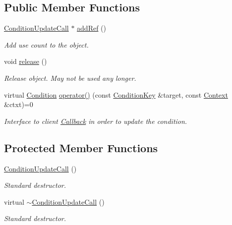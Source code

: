 \subsection*{Public Member Functions}
\begin{DoxyCompactItemize}
\item 
\hyperlink{class_d_d4hep_1_1_conditions_1_1_condition_update_call}{ConditionUpdateCall} $\ast$ \hyperlink{class_d_d4hep_1_1_conditions_1_1_condition_update_call_a6cba5a3773d6291e478b575d1083910f}{addRef} ()
\begin{DoxyCompactList}\small\item\em Add use count to the object. \item\end{DoxyCompactList}\item 
void \hyperlink{class_d_d4hep_1_1_conditions_1_1_condition_update_call_a6009b30c5c1d14c3c489c84d2042f4fe}{release} ()
\begin{DoxyCompactList}\small\item\em Release object. May not be used any longer. \item\end{DoxyCompactList}\item 
virtual \hyperlink{class_d_d4hep_1_1_conditions_1_1_condition}{Condition} \hyperlink{class_d_d4hep_1_1_conditions_1_1_condition_update_call_adc561aca8c6bf851e0ee53f719b26a44}{operator()} (const \hyperlink{class_d_d4hep_1_1_conditions_1_1_condition_key}{ConditionKey} \&target, const \hyperlink{class_d_d4hep_1_1_conditions_1_1_condition_update_context}{Context} \&ctxt)=0
\begin{DoxyCompactList}\small\item\em Interface to client \hyperlink{class_d_d4hep_1_1_callback}{Callback} in order to update the condition. \item\end{DoxyCompactList}\end{DoxyCompactItemize}
\subsection*{Protected Member Functions}
\begin{DoxyCompactItemize}
\item 
\hyperlink{class_d_d4hep_1_1_conditions_1_1_condition_update_call_a23a8cb42aaec80443044176c061f5281}{ConditionUpdateCall} ()
\begin{DoxyCompactList}\small\item\em Standard destructor. \item\end{DoxyCompactList}\item 
virtual \hyperlink{class_d_d4hep_1_1_conditions_1_1_condition_update_call_a1dd8b3414b91f74877af4325c0a0e3c4}{$\sim$ConditionUpdateCall} ()
\begin{DoxyCompactList}\small\item\em Standard destructor. \item\end{DoxyCompactList}\end{DoxyCompactItemize}
